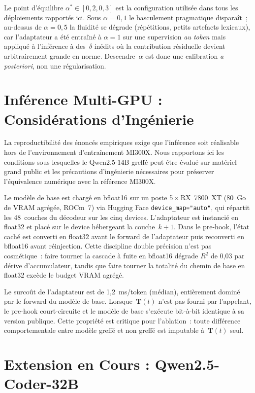 \documentclass[10pt,twocolumn,letterpaper]{article}
\begin{document}
Le point d'équilibre $\alpha^{*}\in[0{,}2,0{,}3]$ est la configuration utilisée dans tous les déploiements rapportés ici. Sous $\alpha\!=\!0{,}1$ le basculement pragmatique disparaît~; au-dessus de $\alpha\!=\!0{,}5$ la fluidité se dégrade (répétitions, petits artefacts lexicaux), car l'adaptateur a été entraîné à $\alpha\!=\!1$ sur une supervision \emph{au token} mais appliqué à l'inférence à des~$\delta$ inédits où la contribution résiduelle devient arbitrairement grande en norme. Descendre~$\alpha$ est donc une calibration \emph{a posteriori}, non une régularisation.

\section{Inférence Multi-GPU : Considérations d'Ingénierie}

La reproductibilité des énoncés empiriques exige que l'inférence soit réalisable hors de l'environnement d'entraînement MI300X. Nous rapportons ici les conditions sous lesquelles le Qwen2.5-14B greffé peut être évalué sur matériel grand public et les précautions d'ingénierie nécessaires pour préserver l'équivalence numérique avec la référence MI300X.

Le modèle de base est chargé en bfloat16 sur un poste 5\,$\times$\,RX~7800~XT (80~Go de VRAM agrégée, ROCm~7) via Hugging Face \texttt{device\_map="auto"}, qui répartit les 48~couches du décodeur sur les cinq devices. L'adaptateur est instancié en float32 et placé sur le device hébergeant la couche~$k{+}1$. Dans le pre-hook, l'état caché est converti en float32 avant le forward de l'adaptateur puis reconverti en bfloat16 avant réinjection. Cette discipline double précision n'est pas cosmétique~: faire tourner la cascade à fuite en bfloat16 dégrade $R^2$ de 0{,}03 par dérive d'accumulateur, tandis que faire tourner la totalité du chemin de base en float32 excède le budget VRAM agrégé.

Le surcoût de l'adaptateur est de 1{,}2~ms/token (médian), entièrement dominé par le forward du modèle de base. Lorsque~$\mathbf{T}(t)$ n'est pas fourni par l'appelant, le pre-hook court-circuite et le modèle de base s'exécute bit-à-bit identique à sa version publique. Cette propriété est critique pour l'ablation~: toute différence comportementale entre modèle greffé et non greffé est imputable à~$\mathbf{T}(t)$ seul.

\section{Extension en Cours : Qwen2.5-Coder-32B}
\label{sec:extension}
\end{document}
